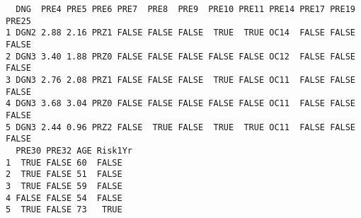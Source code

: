 \documentclass[11pt]{article}
\begin{document}
\begin{verbatim}
  DNG  PRE4 PRE5 PRE6 PRE7  PRE8  PRE9  PRE10 PRE11 PRE14 PRE17 PRE19 PRE25
1 DGN2 2.88 2.16 PRZ1 FALSE FALSE FALSE  TRUE  TRUE OC14  FALSE FALSE FALSE
2 DGN3 3.40 1.88 PRZ0 FALSE FALSE FALSE FALSE FALSE OC12  FALSE FALSE FALSE
3 DGN3 2.76 2.08 PRZ1 FALSE FALSE FALSE  TRUE FALSE OC11  FALSE FALSE FALSE
4 DGN3 3.68 3.04 PRZ0 FALSE FALSE FALSE FALSE FALSE OC11  FALSE FALSE FALSE
5 DGN3 2.44 0.96 PRZ2 FALSE  TRUE FALSE  TRUE  TRUE OC11  FALSE FALSE FALSE
  PRE30 PRE32 AGE Risk1Yr
1  TRUE FALSE 60  FALSE  
2  TRUE FALSE 51  FALSE  
3  TRUE FALSE 59  FALSE  
4 FALSE FALSE 54  FALSE  
5  TRUE FALSE 73   TRUE  
\end{verbatim}
\end{document}
